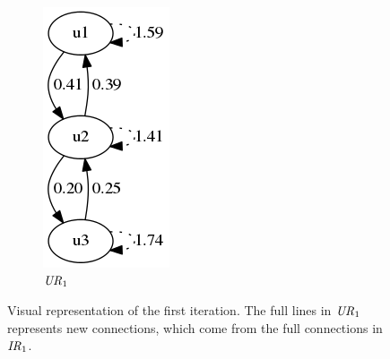 \begin{figure}[h!]
\begin{subfigure}[h!]{0.15\textwidth}
        \includegraphics[width=\textwidth]{fig/example_run/user_user_ur1.png}
        \caption{$\mathit{UR}_1$}
        \label{fig:link:ur1}
    \end{subfigure}
    \caption{Visual representation of the first iteration. The full lines in $\mathit{UR}_1$ represents new connections, which come from the full connections in $\mathit{IR}_1$.}
    \label{fig:link:it1}
\end{figure}

